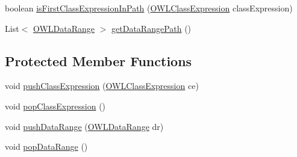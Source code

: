 \begin{DoxyCompactItemize}
\item 
boolean \hyperlink{classorg_1_1semanticweb_1_1owlapi_1_1util_1_1_o_w_l_object_walker_3_01_o_01extends_01_o_w_l_object_01_4_a8542c2cccfcf016c0ae52a6dcf1d1465}{is\-First\-Class\-Expression\-In\-Path} (\hyperlink{interfaceorg_1_1semanticweb_1_1owlapi_1_1model_1_1_o_w_l_class_expression}{O\-W\-L\-Class\-Expression} class\-Expression)
\item 
List$<$ \hyperlink{interfaceorg_1_1semanticweb_1_1owlapi_1_1model_1_1_o_w_l_data_range}{O\-W\-L\-Data\-Range} $>$ \hyperlink{classorg_1_1semanticweb_1_1owlapi_1_1util_1_1_o_w_l_object_walker_3_01_o_01extends_01_o_w_l_object_01_4_a607c108cfc8a86314b3942e2e8248847}{get\-Data\-Range\-Path} ()
\end{DoxyCompactItemize}
\subsection*{Protected Member Functions}
\begin{DoxyCompactItemize}
\item 
void \hyperlink{classorg_1_1semanticweb_1_1owlapi_1_1util_1_1_o_w_l_object_walker_3_01_o_01extends_01_o_w_l_object_01_4_af6cdc8192c62946e1fd5cd9068ef1f37}{push\-Class\-Expression} (\hyperlink{interfaceorg_1_1semanticweb_1_1owlapi_1_1model_1_1_o_w_l_class_expression}{O\-W\-L\-Class\-Expression} ce)
\item 
void \hyperlink{classorg_1_1semanticweb_1_1owlapi_1_1util_1_1_o_w_l_object_walker_3_01_o_01extends_01_o_w_l_object_01_4_a9f9a293b34c3f2338f303e18887d2e2c}{pop\-Class\-Expression} ()
\item 
void \hyperlink{classorg_1_1semanticweb_1_1owlapi_1_1util_1_1_o_w_l_object_walker_3_01_o_01extends_01_o_w_l_object_01_4_a1783518f2f0fd11f38d482a94992fbc9}{push\-Data\-Range} (\hyperlink{interfaceorg_1_1semanticweb_1_1owlapi_1_1model_1_1_o_w_l_data_range}{O\-W\-L\-Data\-Range} dr)
\item 
void \hyperlink{classorg_1_1semanticweb_1_1owlapi_1_1util_1_1_o_w_l_object_walker_3_01_o_01extends_01_o_w_l_object_01_4_a39a9e3681c437c9c52b97e7ab352cd21}{pop\-Data\-Range} ()
\end{DoxyCompactItemize}
